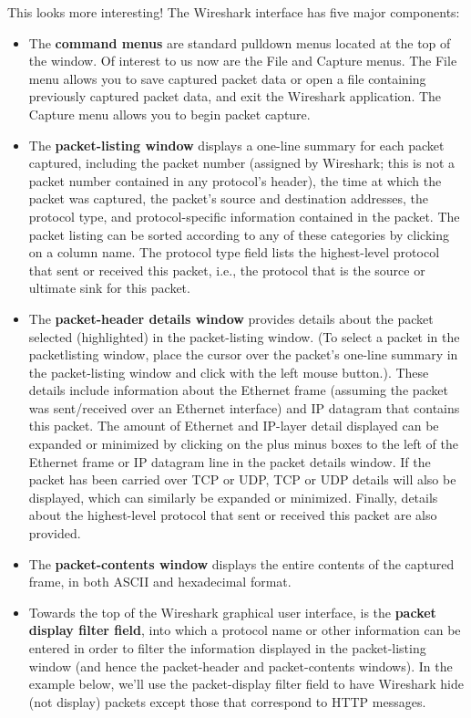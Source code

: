\documentclass[11pt,a4paper]{article}
\begin{document}
This looks more interesting! The Wireshark interface has five major components:
\begin{itemize}
    \item The \textbf{command menus} are standard pulldown menus located at the top of the
    window. Of interest to us now are the File and Capture menus. The File menu
    allows you to save captured packet data or open a file containing previously
    captured packet data, and exit the Wireshark application. The Capture menu
    allows you to begin packet capture.
    \item The \textbf{packet-listing window} displays a one-line summary for each packet
    captured, including the packet number (assigned by Wireshark; this is not a
    packet number contained in any protocol's header), the time at which the packet
    was captured, the packet's source and destination addresses, the protocol type,
    and protocol-specific information contained in the packet. The packet listing can
    be sorted according to any of these categories by clicking on a column name. The
    protocol type field lists the highest-level protocol that sent or received this packet,
    i.e., the protocol that is the source or ultimate sink for this packet.
    \item The \textbf{packet-header details window} provides details about the packet selected
    (highlighted) in the packet-listing window. (To select a packet in the packetlisting
    window, place the cursor over the packet's one-line summary in the
    packet-listing window and click with the left mouse button.). These details
    include information about the Ethernet frame (assuming the packet was
    sent/received over an Ethernet interface) and IP datagram that contains this
    packet. The amount of Ethernet and IP-layer detail displayed can be expanded or
    minimized by clicking on the plus minus boxes to the left of the Ethernet frame or
    IP datagram line in the packet details window. If the packet has been carried over
    TCP or UDP, TCP or UDP details will also be displayed, which can similarly be
    expanded or minimized. Finally, details about the highest-level protocol that sent
    or received this packet are also provided.
    \item The \textbf{packet-contents window} displays the entire contents of the captured frame,
    in both ASCII and hexadecimal format.
    \item Towards the top of the Wireshark graphical user interface, is the \textbf{packet display
    filter field}, into which a protocol name or other information can be entered in
    order to filter the information displayed in the packet-listing window (and hence
    the packet-header and packet-contents windows). In the example below, we'll
    use the packet-display filter field to have Wireshark hide (not display) packets
    except those that correspond to HTTP messages.
\end{itemize}
\end{document}
